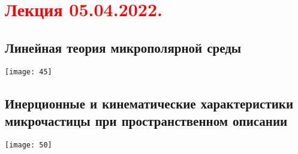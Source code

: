 \documentclass[main.tex]{subfiles}
\begin{document}
\section{\textcolor{red}{Лекция 05.04.2022.}}

\subsection{Линейная теория микрополярной среды}
\texttt{[image: 45]}





\subsection{Инерционные и кинематические характеристики микрочастицы при пространственном описании}
\texttt{[image: 50]}



\end{document}
